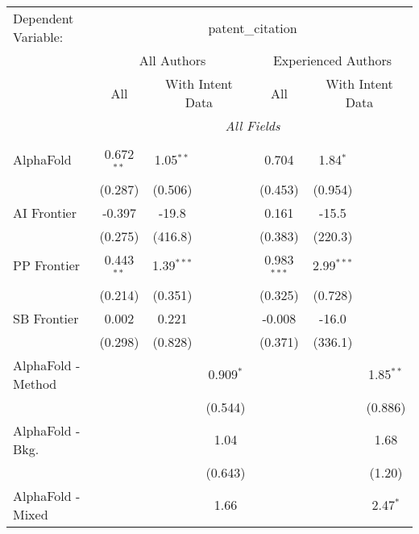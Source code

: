 \begingroup
\centering
\begin{tabular}{lcccccc}
   \tabularnewline \midrule \midrule
   Dependent Variable: & \multicolumn{6}{c}{patent\_citation}\\
 & \multicolumn{3}{c}{All Authors} & \multicolumn{3}{c}{Experienced Authors} \\
\cmidrule(lr){2-4} \cmidrule(lr){5-7}
 & \multicolumn{1}{c}{All} & \multicolumn{2}{c}{With Intent Data} & \multicolumn{1}{c}{All} & \multicolumn{2}{c}{With Intent Data} \\
\cmidrule(lr){2-2} \cmidrule(lr){3-4} \cmidrule(lr){5-5} \cmidrule(lr){6-7}
 & \multicolumn{6}{c}{\textit{All Fields}} \\ \\
   AlphaFold            & 0.672$^{**}$ & 1.05$^{**}$  &              & 0.704         & 1.84$^{*}$   &   \\   
                        & (0.287)      & (0.506)      &              & (0.453)       & (0.954)      &   \\   
   AI Frontier          & -0.397       & -19.8        &              & 0.161         & -15.5        &   \\   
                        & (0.275)      & (416.8)      &              & (0.383)       & (220.3)      &   \\   
   PP Frontier          & 0.443$^{**}$ & 1.39$^{***}$ &              & 0.983$^{***}$ & 2.99$^{***}$ &   \\   
                        & (0.214)      & (0.351)      &              & (0.325)       & (0.728)      &   \\   
   SB Frontier          & 0.002        & 0.221        &              & -0.008        & -16.0        &   \\   
                        & (0.298)      & (0.828)      &              & (0.371)       & (336.1)      &   \\   
   AlphaFold - Method   &              &              & 0.909$^{*}$  &               &              & 1.85$^{**}$\\   
                        &              &              & (0.544)      &               &              & (0.886)\\   
   AlphaFold - Bkg.     &              &              & 1.04         &               &              & 1.68\\   
                        &              &              & (0.643)      &               &              & (1.20)\\   
   AlphaFold - Mixed    &              &              & 1.66         &               &              & 2.47$^{*}$\\   

\end{tabular}
